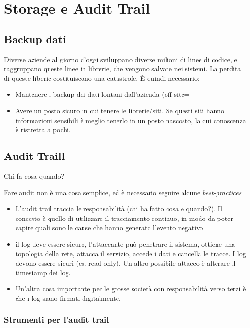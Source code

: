 \section{Storage e Audit Trail}

\subsection{Backup dati}

Diverse aziende al giorno d'oggi sviluppano diverse milioni di linee di codice, 
e raggruppano queste linee in librerie, che vengono salvate nei sistemi. La 
perdita di queste liberie costituiscono una catastrofe. È quindi necessario:
\begin{itemize}
 \item Mantenere i backup dei dati lontani dall'azienda (off-site=
 \item Avere un posto sicuro in cui tenere le librerie/siti. Se questi siti 
 hanno informazioni sensibili è meglio tenerlo in un posto nascosto, la cui 
 conoscenza è ristretta a pochi.
\end{itemize}

\subsection{Audit Traill}

Chi fa cosa quando?

Fare audit non è una cosa semplice, ed è necessario seguire alcune 
\textit{best-practices}

\begin{itemize}
 \item L'audit trail traccia le responsabilità (chi ha fatto cosa e quando?). 
 Il concetto è quello di utilizzare il tracciamento continuo, in modo da poter 
 capire quali sono le cause che hanno generato l'evento negativo
 \item il log deve essere sicuro, l'attaccante può penetrare il sistema, 
 ottiene una topologia della rete, attacca il servizio, accede i dati e 
 cancella le tracce. I log devono essere sicuri (es. read only). Un altro 
 possibile attacco è alterare il timestamp dei log.
 \item Un'altra cosa importante per le grosse società con responsabilità verso 
 terzi è che i log siano firmati digitalmente.

\end{itemize}

\subsubsection{Strumenti per l'audit trail}


